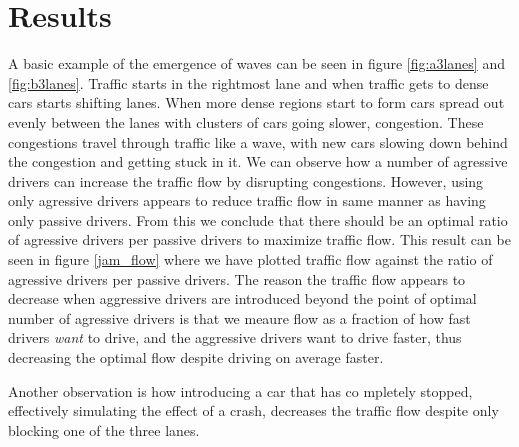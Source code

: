 \documentclass[11pt,a4paper,twocolumn]{article}
\begin{document}
\section{Results}
A basic example of the emergence of waves can be seen in figure \ref{fig:a3lanes} and \ref{fig:b3lanes}. Traffic starts in the rightmost lane and when traffic gets to dense cars starts shifting lanes. When more dense regions start to form cars spread out evenly between the lanes with clusters of cars going slower, congestion. These congestions travel through traffic like a wave, with new cars slowing down behind the congestion and getting stuck in it.
We can observe how a number of agressive drivers can increase the traffic flow by disrupting congestions. However, using only agressive drivers appears to reduce traffic flow in same manner as having only passive drivers. From this we conclude that there should be an optimal ratio of agressive drivers per passive drivers to maximize traffic flow. This result can be seen in figure \ref{jam_flow} where we have plotted traffic flow against the ratio of agressive drivers per passive drivers.
The reason the traffic flow appears to decrease when aggressive drivers are introduced beyond the point of optimal number of agressive drivers is that we meaure flow as a fraction of how fast drivers \textit{want} to drive, and the aggressive drivers want to drive faster, thus decreasing the optimal flow despite driving on average faster.

Another observation is how introducing a car that has co mpletely stopped, effectively simulating the effect of a crash, decreases the traffic flow despite only blocking one of the three lanes.

\end{document}

